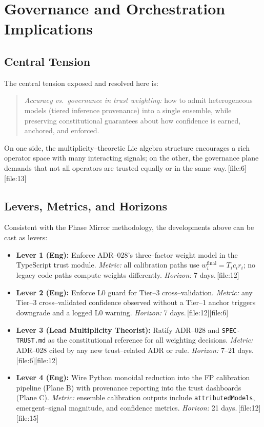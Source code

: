 \documentclass[11pt]{article}
\begin{document}
\section{Governance and Orchestration Implications}

\subsection{Central Tension}

The central tension exposed and resolved here is:

\begin{quote}
  \emph{Accuracy vs.\ governance in trust weighting:}
  how to admit heterogeneous models (tiered inference provenance) into a
  single ensemble, while preserving constitutional guarantees about how
  confidence is earned, anchored, and enforced.
\end{quote}

On one side, the multiplicity--theoretic Lie algebra structure encourages a
rich operator space with many interacting signals; on the other, the
governance plane demands that not all operators are trusted equally or in the
same way.\,[file:6][file:13]

\subsection{Levers, Metrics, and Horizons}

Consistent with the Phase Mirror methodology, the developments above can be
cast as levers:

\begin{itemize}[leftmargin=*]
  \item \textbf{Lever 1 (Eng):} Enforce ADR--028's three--factor weight model
  in the TypeScript trust module.
  \emph{Metric:} all calibration paths use \(w_i^{\text{final}} =
  T_i c_i r_i\); no legacy code paths compute weights differently.
  \emph{Horizon:} 7 days.\,[file:12]

  \item \textbf{Lever 2 (Eng):} Enforce L0 guard for Tier--3 cross--validation.
  \emph{Metric:} any Tier--3 cross--validated confidence observed without a
  Tier--1 anchor triggers downgrade and a logged L0 warning.
  \emph{Horizon:} 7 days.\,[file:12][file:6]

  \item \textbf{Lever 3 (Lead Multiplicity Theorist):} Ratify ADR--028 and
  \texttt{SPEC-TRUST.md} as the constitutional reference for all weighting
  decisions.
  \emph{Metric:} ADR--028 cited by any new trust--related ADR or rule.
  \emph{Horizon:} 7--21 days.\,[file:6][file:12]

  \item \textbf{Lever 4 (Eng):} Wire Python monoidal reduction into the FP
  calibration pipeline (Plane B) with provenance reporting into the trust
  dashboards (Plane C).
  \emph{Metric:} ensemble calibration outputs include
  \texttt{attributedModels}, emergent--signal magnitude, and confidence
  metrics.
  \emph{Horizon:} 21 days.\,[file:12][file:15]
\end{itemize}
\end{document}
